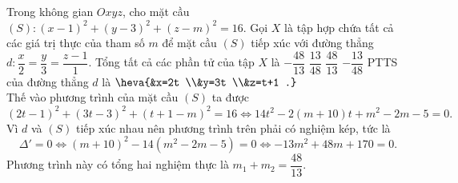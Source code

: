 \begin{ex}%
Trong không gian $Oxyz$, cho mặt cầu $\left(S\right)\colon(x-1)^2 + (y-3)^2 + (z-m)^2 = 16$. Gọi $X$ là tập hợp chứa tất cả các giá trị thực của tham số $m$ để mặt cầu $\left(S\right)$ tiếp xúc với đường thẳng $d\colon\dfrac{x}{2} = \dfrac{y}{3} = \dfrac{z-1}{1}$. Tổng tất cả các phần tử của tập $X$ là
\choice
{$-\dfrac{48}{13}$}
{$\dfrac{13}{48}$}
{\True $\dfrac{48}{13}$}
{$-\dfrac{13}{48}$}
\loigiai
{
PTTS của đường thẳng $d$ là $\heva{&x=2t \\&y=3t \\&z=t+1  .}$\\
Thế vào phương trình của mặt cầu $\left(S\right)$ ta được
\[(2t-1)^2 + (3t-3)^2 + (t+1-m)^2 = 16 \Leftrightarrow 14t^2 - 2(m+10)t + m^2 - 2m -5 = 0.\]
Vì $d$ và $\left(S\right)$ tiếp xúc nhau nên phương trình trên phải có nghiệm kép, tức là
\[\Delta' = 0 \Leftrightarrow (m + 10)^2 - 14(m^2 - 2m -5) = 0\Leftrightarrow -13m^2 + 48m + 170 = 0.\]
Phương trình này có tổng hai nghiệm thực là $m_1 + m_2 = \dfrac{48}{13}$.
}
\end{ex}



